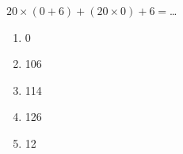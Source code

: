 $20\times(0+6)+(20\times0)+6=$\ldots
\begin{multicols}{5}
  \begin{enumerate}[A/]
  \item 0
  \item 106
  \item 114
  \item 126
  \item 12
  \end{enumerate}
\end{multicols}
